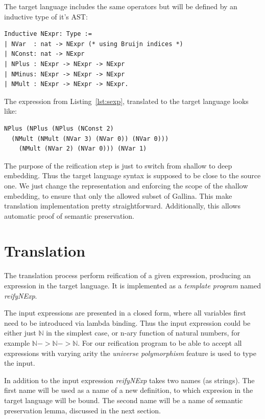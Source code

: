 \documentclass[sigplan]{acmart}\settopmatter{printfolios=true,printccs=false,printacmref=false}
\newcommand{\N}{\mathbb{N}}
\begin{document}
The target language includes the same operators but will be defined by
an inductive type of it's AST:

\begin{lstlisting}[language=Coq, mathescape=true,
  caption=Target Language type
  frame=single,basicstyle=\footnotesize]
Inductive NExpr: Type :=
| NVar  : nat -> NExpr (* using Bruijn indices *)
| NConst: nat -> NExpr
| NPlus : NExpr -> NExpr -> NExpr
| NMinus: NExpr -> NExpr -> NExpr
| NMult : NExpr -> NExpr -> NExpr.
\end{lstlisting}

The expression from Listing~\ref{lst:sexp}, translated to the target
language looks like:

\begin{lstlisting}[language=Coq, mathescape=true,
  frame=single, basicstyle=\footnotesize,
  caption=Expression in target language, label=lst:texp]
NPlus (NPlus (NPlus (NConst 2)
  (NMult (NMult (NVar 3) (NVar 0)) (NVar 0)))
    (NMult (NVar 2) (NVar 0))) (NVar 1)
\end{lstlisting}

The purpose of the reification step is just to switch from shallow to
deep embedding. Thus the target language syntax is supposed to be
close to the source one. We just change the representation and
enforcing the scope of the shallow embedding, to ensure that only the
allowed subset of Gallina. This make translation implementation pretty
straightforward. Additionally, this allows automatic proof of semantic
preservation.

\section{Translation}

The translation process perform reification of a given expression,
producing an expression in the target language. It is implemented as a
\textit{template program} named \emph{reifyNExp}.

The input expressions are presented in a closed form, where all
variables first need to be introduced via lambda binding. Thus the
input expression could be either just $\N$ in the simplest case, or
n-ary function of natural numbers, for example $\N -> \N -> \N$.  For
our reification program to be able to accept all expressions with
varying arity the \textit{universe polymorphism}
feature\cite{sozeau2014universe} is used to type the input.

In addition to the input expression \emph{reifyNExp} takes two names
(as strings). The first name will be used as a name of a new
definition, to which expresion in the target language will be
bound. The second name will be a name of semantic preservation lemma,
discussed in the next section.
\end{document}
